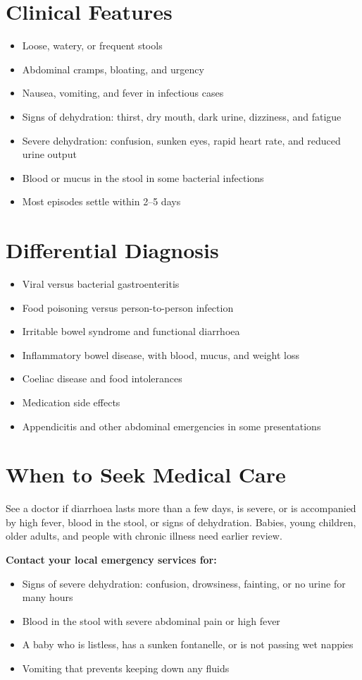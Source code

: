 \section*{Clinical Features}
\begin{itemize}
    \item Loose, watery, or frequent stools
    \item Abdominal cramps, bloating, and urgency
    \item Nausea, vomiting, and fever in infectious cases
    \item Signs of dehydration: thirst, dry mouth, dark urine, dizziness, and fatigue
    \item Severe dehydration: confusion, sunken eyes, rapid heart rate, and reduced urine output
    \item Blood or mucus in the stool in some bacterial infections
    \item Most episodes settle within 2--5 days
\end{itemize}

\section*{Differential Diagnosis}
\begin{itemize}
    \item Viral versus bacterial gastroenteritis
    \item Food poisoning versus person-to-person infection
    \item Irritable bowel syndrome and functional diarrhoea
    \item Inflammatory bowel disease, with blood, mucus, and weight loss
    \item Coeliac disease and food intolerances
    \item Medication side effects
    \item Appendicitis and other abdominal emergencies in some presentations
\end{itemize}

\section*{When to Seek Medical Care}
See a doctor if diarrhoea lasts more than a few days, is severe, or is accompanied by high fever, blood in the stool, or signs of dehydration. Babies, young children, older adults, and people with chronic illness need earlier review.

\textbf{Contact your local emergency services for:}
\begin{itemize}
    \item Signs of severe dehydration: confusion, drowsiness, fainting, or no urine for many hours
    \item Blood in the stool with severe abdominal pain or high fever
    \item A baby who is listless, has a sunken fontanelle, or is not passing wet nappies
    \item Vomiting that prevents keeping down any fluids
\end{itemize}

